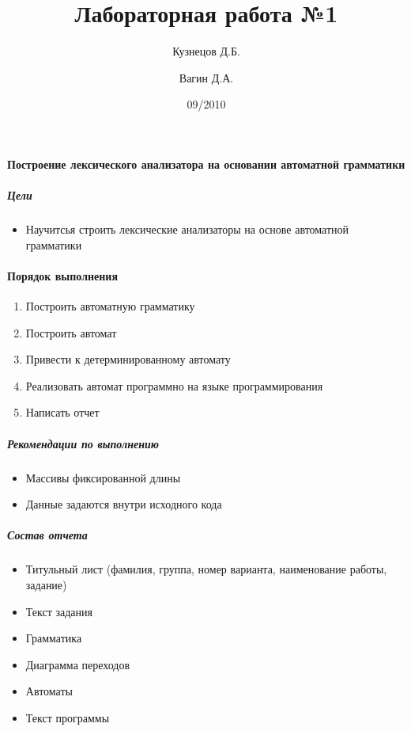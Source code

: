 \documentclass[a4paper,12pt]{article}
\title{Лабораторная работа №1}
\author{Кузнецов Д.Б.\and Вагин Д.А.}
\date{09/2010}
\begin{document}
\paragraph{Построение лексического анализатора на основании автоматной грамматики}
\subparagraph{Цели}
\begin{itemize}
	\item Научитсья строить лексические анализаторы на основе автоматной грамматики
\end{itemize}

\paragraph{Порядок выполнения}
\begin{enumerate}
	\item Построить автоматную грамматику
	\item Построить автомат
	\item Привести к детерминированному автомату
	\item Реализовать автомат программно на языке программирования
	\item Написать отчет
\end{enumerate}

\subparagraph{Рекомендации по выполнению}
\begin{itemize}
	\item Массивы фиксированной длины
	\item Данные задаются внутри исходного кода
\end{itemize}

\subparagraph{Состав отчета}
\begin{itemize}
	\item Титульный лист (фамилия, группа, номер варианта, наименование работы, задание)
	\item Текст задания
	\item Грамматика
	\item Диаграмма переходов
	\item Автоматы
	\item Текст программы
\end{itemize}
\end{document}

